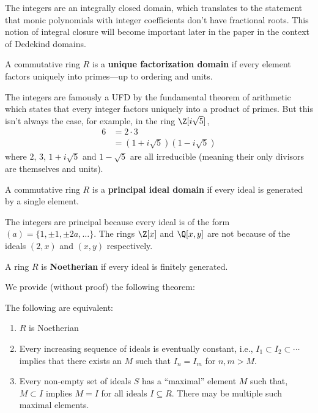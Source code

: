 The integers are an integrally closed domain, which translates to the statement that monic polynomials with integer coefficients don't have fractional roots.
This notion of integral closure will become important later in the paper in the context of Dedekind domains.

\begin{definition}
    A commutative ring $R$ is a \textbf{unique factorization domain} if every element factors uniquely into primes---up to ordering and units.
\end{definition}

The integers are famously a UFD by the fundamental theorem of arithmetic which states that every integer factors uniquely into a product of primes. But this isn't always the case, for example, in the ring $\Z[i \sqrt 5]$,
\begin{equation}
    \begin{aligned}
        6 & = 2 \cdot 3                     \\
          & = (1 + i \sqrt5) (1 - i \sqrt5)
    \end{aligned}
\end{equation}
where $2$, $3$, $1 + i \sqrt 5$ and $1 - \sqrt 5$ are all irreducible (meaning their only divisors are themselves and units).

\begin{definition}
    A commutative ring $R$ is a \textbf{principal ideal domain} if every ideal is generated by a single element.
\end{definition}

The integers are principal because every ideal is of the form $(a) = \{ 1, \pm 1, \pm2a, \ldots \}$.
The rings $\Z[x]$ and $\Q[x, y]$ are not because of the ideals $(2, x)$ and $(x, y)$ respectively.

\begin{definition}
    \label{def:noetherian}
    A ring $R$ is \textbf{Noetherian} if every ideal is finitely generated.
\end{definition}

We provide (without proof) the following theorem:

\begin{theorem}
    The following are equivalent:
    \begin{enumerate}
        \item $R$ is Noetherian
        \item Every increasing sequence of ideals is eventually constant, i.e., $I_1 \subset I_2 \subset \cdots$ implies that there exists an $M$ such that $I_n = I_m$ for $n, m > M$.
        \item Every non-empty set of ideals $S$ has a ``maximal'' element $M$ such that, $M \subset I$ implies $M = I$ for all ideals $I \subseteq R$. There may be multiple such maximal elements.
    \end{enumerate}
\end{theorem}

